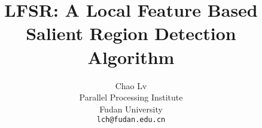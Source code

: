 \documentclass[10pt,twocolumn,letterpaper]{article}
\newcommand{\sys}{LFSR}
\begin{document}
\title{{\sys}: A Local Feature Based Salient Region Detection Algorithm}

\author{
	\alignauthor
	Chao Lv\\
    Parallel Processing Institute\\
    Fudan University\\
    {\tt\small lch@fudan.edu.cn}
}

\maketitle




















%

{\small


}
\end{document}
